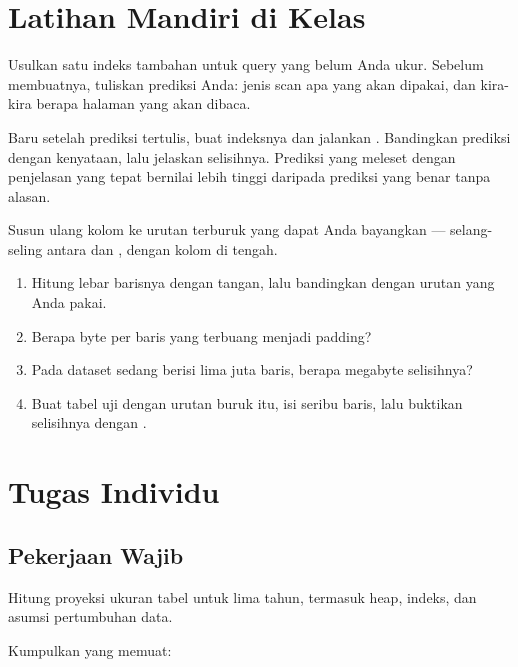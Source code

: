 \section{Latihan Mandiri di Kelas}


Usulkan satu indeks tambahan untuk query yang belum Anda ukur. Sebelum
membuatnya, tuliskan prediksi Anda: jenis scan apa yang akan dipakai, dan
kira-kira berapa halaman yang akan dibaca.

Baru setelah prediksi tertulis, buat indeksnya dan jalankan
. Bandingkan prediksi dengan kenyataan,
lalu jelaskan selisihnya. Prediksi yang meleset dengan penjelasan yang tepat
bernilai lebih tinggi daripada prediksi yang benar tanpa alasan.


Susun ulang kolom  ke urutan terburuk yang dapat
Anda bayangkan --- selang-seling antara  dan
, dengan kolom  di tengah.

\begin{enumerate}[leftmargin=1.4em]
  \item Hitung lebar barisnya dengan tangan, lalu bandingkan dengan urutan
        yang Anda pakai.
  \item Berapa byte per baris yang terbuang menjadi padding?
  \item Pada dataset sedang berisi lima juta baris, berapa megabyte selisihnya?
  \item Buat tabel uji dengan urutan buruk itu, isi seribu baris, lalu
        buktikan selisihnya dengan .
\end{enumerate}

\section{Tugas Individu}

\subsection{Pekerjaan Wajib}
Hitung proyeksi ukuran tabel untuk lima tahun, termasuk heap, indeks, dan
asumsi pertumbuhan data.

Kumpulkan  yang memuat:

